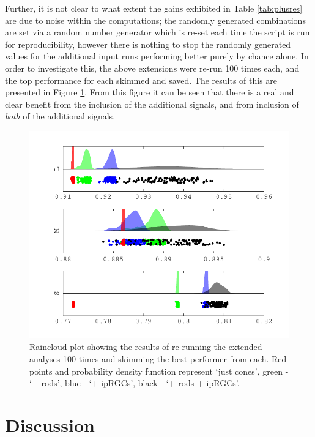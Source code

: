 Further, it is not clear to what extent the gains exhibited in Table \ref{tab:plusres} are due to noise within the computations; the randomly generated combinations are set via a random number generator which is re-set each time the script is run for reproducibility, however there is nothing to stop the randomly generated values for the additional input runs performing better purely by chance alone. In order to investigate this, the above extensions were re-run 100 times each, and the top performance for each skimmed and saved. The results of this are presented in Figure \ref{fig:relcontributions}. From this figure it can be seen that there is a real and clear benefit from the inclusion of the additional signals, and from inclusion of \emph{both} of the additional signals.

\begin{figure}[htbp]
\includegraphics[max width=\textwidth]{figs/LargeSphere/relcontributions.pdf}
\caption{Raincloud plot \cite{allen_raincloud_2019} showing the results of re-running the extended analyses 100 times and skimming the best performer from each. Red points and probability density function represent `just cones', green - `+ rods', blue - `+ \glspl{ipRGC}', black - `+ rods + \glspl{ipRGC}'.}
\label{fig:relcontributions}
\end{figure}

\section{Discussion}

